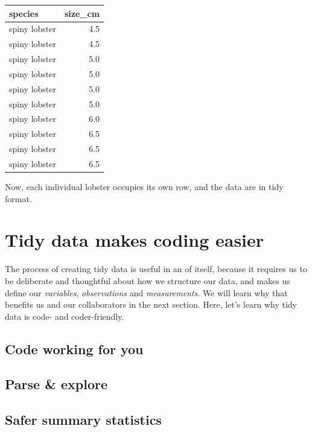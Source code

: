 \documentclass[
]{book}
\begin{document}
\begin{table}[H]
\centering
\begin{tabular}{l|r}
\hline
species & size\_cm\\
\hline
spiny lobster & 4.5\\
\hline
spiny lobster & 4.5\\
\hline
spiny lobster & 5.0\\
\hline
spiny lobster & 5.0\\
\hline
spiny lobster & 5.0\\
\hline
spiny lobster & 5.0\\
\hline
spiny lobster & 6.0\\
\hline
spiny lobster & 6.5\\
\hline
spiny lobster & 6.5\\
\hline
spiny lobster & 6.5\\
\hline
\end{tabular}
\end{table}

Now, each individual lobster occupies its own row, and the data are in tidy format.

\hypertarget{tidy-data-makes-coding-easier}{%
\section{Tidy data makes coding easier}\label{tidy-data-makes-coding-easier}}

The process of creating tidy data is useful in an of itself, because it requires us to be deliberate and thoughtful about how we structure our data, and makes us define our \emph{variables}, \emph{observations} and \emph{measurements}. We will learn why that benefits us and our collaborators in the next section. Here, let's learn why tidy data is code- and coder-friendly.

\hypertarget{code-working-for-you}{%
\subsection{Code working for you}\label{code-working-for-you}}

\hypertarget{parse-explore}{%
\subsection{Parse \& explore}\label{parse-explore}}

\hypertarget{safer-summary-statistics}{%
\subsection{Safer summary statistics}\label{safer-summary-statistics}}
\end{document}
